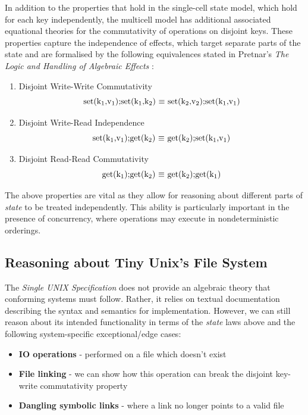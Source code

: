 \documentclass[logo,bsc,singlespacing,parskip]{infthesis}
\begin{document}
In addition to the properties that hold in the single-cell state model, which hold for each key independently,  the multicell model has additional associated equational theories for the commutativity of operations on disjoint keys. These properties capture the independence of effects, which target separate parts of the state and are formalised by the following equivalences stated in Pretnar's \textit{The Logic and Handling of
Algebraic Effects} \cite{Pretnar:2010}:
\begin{enumerate}
    \item Disjoint Write-Write Commutativity \[ \text{set(k\textsubscript{1},v\textsubscript{1});set(k\textsubscript{1},k\textsubscript{2}) $\equiv$ set(k\textsubscript{2},v\textsubscript{2});set(k\textsubscript{1},v\textsubscript{1})} \] 
    \item Disjoint Write-Read Independence \[ \text{set(k\textsubscript{1},v\textsubscript{1});get(k\textsubscript{2}) $\equiv$ get(k\textsubscript{2});set(k\textsubscript{1},v\textsubscript{1})} \] 
    \item Disjoint Read-Read Commutativity \[\text{get(k\textsubscript{1});get(k\textsubscript{2}) $\equiv$ get(k\textsubscript{2});get(k\textsubscript{1})} \] 
\end{enumerate}

The above properties are vital as they allow for reasoning about different parts of \textit{state} to be treated independently. This ability is particularly important in the presence of concurrency, where operations may execute in nondeterministic orderings.


\subsection{Reasoning about Tiny Unix's File System}

The \textit{Single UNIX Specification} \cite{SUSv4} does not provide an algebraic theory that conforming systems must follow. Rather, it relies on textual documentation describing the syntax and semantics for implementation. However, we can still reason about its intended functionality in terms of the \textit{state} laws above and the following system-specific exceptional/edge cases:

\begin{itemize}
    \item \textbf{IO operations} - performed on a file which doesn't exist
    \item \textbf{File linking} - we can show how this operation can break the disjoint key-write commutativity property
    \item \textbf{Dangling symbolic links} - where a link no longer points to a valid file
\end{itemize}
\end{document}
